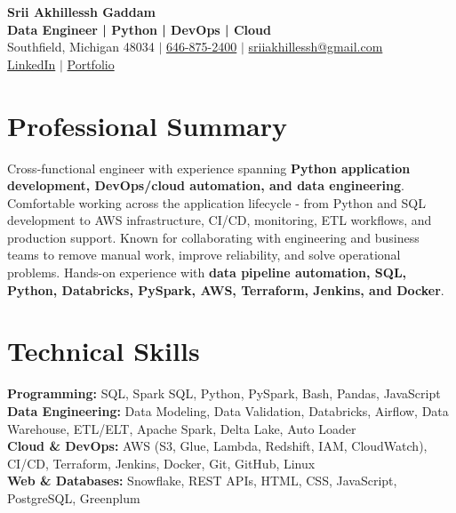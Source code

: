 \documentclass[letterpaper,10pt]{article}
\begin{document}
\fontsize{9.35pt}{10.45pt}\selectfont

\begin{center}
    {\LARGE \textbf{Srii Akhillessh Gaddam}} \\[-1pt]
    \textbf{Data Engineer | Python | DevOps | Cloud} \\[2pt]
    Southfield, Michigan 48034 $|$
    \href{tel:6468752400}{646-875-2400} $|$
    \href{mailto:sriiakhillessh@gmail.com}{sriiakhillessh@gmail.com} \\[1pt]
    \href{https://www.linkedin.com/in/srii-akhiilessh-gaddam-b48668191/}{LinkedIn} $|$
    \href{https://sriiakhillesshg.github.io/portfolio/}{Portfolio}
\end{center}
\vspace{-8pt}

\section{Professional Summary}
\small{Cross-functional engineer with experience spanning \textbf{Python application development, DevOps/cloud automation, and data engineering}. Comfortable working across the application lifecycle - from Python and SQL development to AWS infrastructure, CI/CD, monitoring, ETL workflows, and production support. Known for collaborating with engineering and business teams to remove manual work, improve reliability, and solve operational problems. Hands-on experience with \textbf{data pipeline automation, SQL, Python, Databricks, PySpark, AWS, Terraform, Jenkins, and Docker}.}

\section{Technical Skills}
\small{
\textbf{Programming:} SQL, Spark SQL, Python, PySpark, Bash, Pandas, JavaScript \\
\textbf{Data Engineering:} Data Modeling, Data Validation, Databricks, Airflow, Data Warehouse, ETL/ELT, Apache Spark, Delta Lake, Auto Loader \\
\textbf{Cloud \& DevOps:} AWS (S3, Glue, Lambda, Redshift, IAM, CloudWatch), CI/CD, Terraform, Jenkins, Docker, Git, GitHub, Linux \\
\textbf{Web \& Databases:} Snowflake, REST APIs, HTML, CSS, JavaScript, PostgreSQL, Greenplum
}
\end{document}

